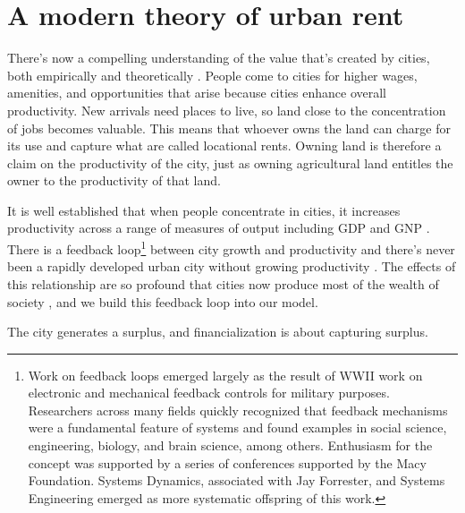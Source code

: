 \section{A modern theory of urban rent}
There's now a compelling understanding of the value that's created by cities, both empirically and theoretically \cite{jacobsEconomyCities1969, spenceUrbanizationGrowth2009, bettencourtIntroductionUrbanScience2021}. 
People come to cities for higher wages, amenities, and opportunities that arise because cities enhance overall productivity. New arrivals need places to live, so land close to the concentration of jobs becomes valuable. This means that whoever owns the land can charge for its use and capture what are called \glspl{locational rent}. Owning land is therefore a claim on the productivity of the city, just as owning agricultural land entitles the owner to the productivity of that land. %

 It is well established that when people concentrate in cities, it increases productivity across a range of measures of output including GDP and GNP \cite{bettencourtIntroductionUrbanScience2021}.  There is a feedback loop\footnote{Work on feedback loops emerged largely as the result of WWII work on electronic and mechanical feedback controls for military purposes. Researchers across many fields %
 quickly recognized that feedback mechanisms were a fundamental feature of systems and found examples in social science, engineering, biology, and brain science, among others. Enthusiasm for the concept was supported by a series of conferences supported by the Macy Foundation. %
 Systems Dynamics, associated with Jay Forrester, and Systems Engineering emerged as more systematic offspring of this work.} %
 between city growth and productivity and there's never been a rapidly developed urban city without growing productivity \cite{annezUrbanizationGrowthSetting2009}.  %
 The effects of this relationship are so profound that cities now produce most of the wealth of society \cite{GET_cities-most-of-wealth}, and we build this feedback loop into our model.  


The city generates a surplus, and financialization is about capturing surplus. 





